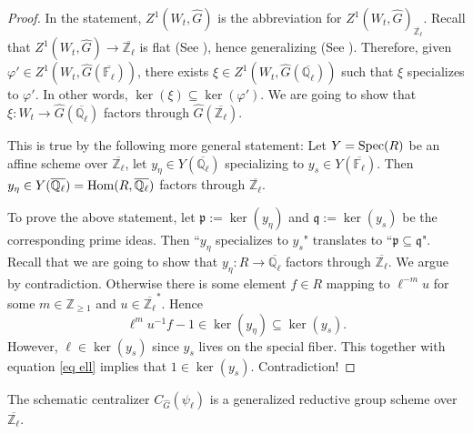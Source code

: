 \begin{proof}
	In the statement, $Z^1(W_t, \hat{G})$ is the abbreviation for $Z^1(W_t, \hat{G})_{\overline{\mathbb{Z}_{\ell}}}$. Recall that $Z^1(W_t, \hat{G}) \to \overline{\mathbb{Z}_{\ell}}$ is flat (See \cite[Proposition 3.3]{dat2022ihes}), hence generalizing (See \cite[Stack, Tag 01U2]{stacks-project}). Therefore, given $\varphi' \in Z^1(W_t, \hat{G}(\overline{\mathbb{F}_{\ell}}))$, there exists $\xi \in Z^1(W_t, \hat{G}(\overline{\mathbb{Q}_{\ell}}))$ such that $\xi$ specializes to $\varphi'$. In other words, $\ker(\xi) \subseteq \ker(\varphi')$. We are going to show that $\xi: W_t \to \hat{G}(\overline{\mathbb{Q}_{\ell}})$ factors through  $\hat{G}(\overline{\mathbb{Z}_{\ell}})$.
	
	This is true by the following more general statement: Let $Y=\operatorname{\operatorname{Spec}}(R)$ be an affine scheme over $\overline{\mathbb{Z}_{\ell}}$, let $y_{\eta} \in Y(\overline{\mathbb{Q}_{\ell}})$ specializing to $y_s \in Y(\overline{\mathbb{F}_{\ell}})$.  Then $y_{\eta} \in Y(\overline{\mathbb{Q}_{\ell}})=\operatorname{\operatorname{Hom}}(R, \overline{\mathbb{Q}_{\ell}})$ factors through $\overline{\mathbb{Z}_{\ell}}$.
	
    To prove the above statement, let $\mathfrak{p}:=\ker(y_\eta)$ and $\mathfrak{q}:=\ker(y_s)$ be the corresponding prime ideas. Then ``$y_{\eta}$ specializes to $y_s$" translates to ``$\mathfrak{p} \subseteq \mathfrak{q}$". Recall that we are going to show that $y_{\eta}: R \to \overline{\mathbb{Q}_{\ell}}$ factors through $\overline{\mathbb{Z}_{\ell}}$. We argue by contradiction. Otherwise there is some element $f \in R$ mapping to $\ell^{-m}u$ for some $m \in \mathbb{Z}_{\geq 1}$ and $u \in \overline{\mathbb{Z}_{\ell}}^*$. Hence 
    \begin{equation}\label{eq ell}
    	\ell^mu^{-1}f-1 \in \ker(y_{\eta}) \subseteq \ker(y_s).
    \end{equation}
    However, $\ell \in \ker(y_s)$ since $y_s$ lives on the special fiber. This together with equation \ref{eq ell} implies that $1 \in \ker(y_s)$. Contradiction!
\end{proof}

\begin{lemma}\label{Lem gen red}
	The schematic centralizer $C_{\hat{G}}(\psi_{\ell})$ is a generalized reductive group scheme over $\overline{\mathbb{Z}_{\ell}}$.
\end{lemma}

